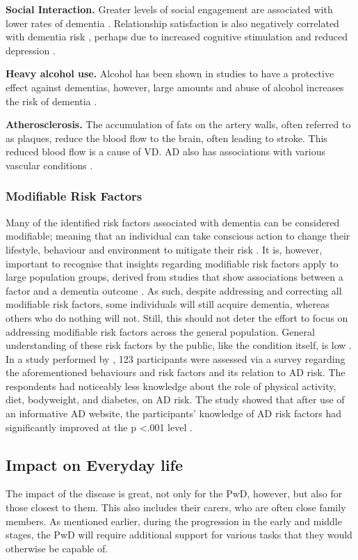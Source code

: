 \textbf{Social Interaction.}
Greater levels of social engagement are associated with lower rates of dementia \cite{Saczynski2006, Fratiglioni2000}. Relationship satisfaction is also negatively correlated with dementia risk \cite{Amieva2010}, perhaps due to increased cognitive stimulation and reduced depression \cite{Saczynski2010}.

\textbf{Heavy alcohol use.}
Alcohol has been shown in studies to have a protective effect against dementias, however, large amounts and abuse of alcohol increases the risk of dementia \cite{AlzheimerEurope2015}.

\textbf{Atherosclerosis.}
The accumulation of fats on the artery walls, often referred to as plaques, reduce the blood flow to the brain, often leading to stroke. This reduced blood flow is a cause of VD. AD also has associations with various vascular conditions \cite{Dolan2010}.

\subsubsection{Modifiable Risk Factors}
Many of the identified risk factors associated with dementia can be considered modifiable; meaning that an individual can take conscious action to change their lifestyle, behaviour and environment to mitigate their risk \cite{AlzheimersAssociation2015b}. It is, however, important to recognise that insights regarding modifiable risk factors apply to large population groups, derived from studies that show associations between a factor and a dementia outcome \cite{Baumgart2015}. As such, despite addressing and correcting all modifiable risk factors, some individuals will still acquire dementia, whereas others who do nothing will not. Still, this should not deter the effort to focus on addressing modifiable risk factors across the general population. General understanding of these risk factors by the public, like the condition itself, is low \cite{Farrow2013}. In a study performed by \cite{Farrow2013}, 123 participants were assessed via a survey regarding the aforementioned behaviours and risk factors and its relation to AD risk. The respondents had noticeably less knowledge about the role of physical activity, diet, bodyweight, and diabetes, on AD risk. The study showed that after use of an informative AD website, the participants' knowledge of AD risk factors had significantly improved at the p \textless .001 level \cite{Farrow2013}.

\subsection{Impact on Everyday life}
The impact of the disease is great, not only for the PwD, however, but also for those closest to them. This also includes their carers, who are often close family members. As mentioned earlier, during the progression in the early and middle stages, the PwD will require additional support for various tasks that they would otherwise be capable of.

